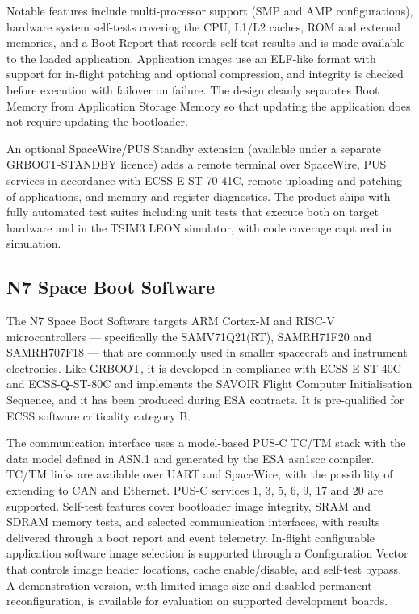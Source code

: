 Notable features include multi-processor support (SMP and AMP configurations), hardware system self-tests covering the CPU, L1/L2 caches, ROM and external memories, and a Boot Report that records self-test results and is made available to the loaded application. Application images use an ELF-like format with support for in-flight patching and optional compression, and integrity is checked before execution with failover on failure. The design cleanly separates Boot Memory from Application Storage Memory so that updating the application does not require updating the bootloader.

An optional SpaceWire/PUS Standby extension (available under a separate GRBOOT-STANDBY licence) adds a remote terminal over SpaceWire, PUS services in accordance with ECSS-E-ST-70-41C, remote uploading and patching of applications, and memory and register diagnostics. The product ships with fully automated test suites including unit tests that execute both on target hardware and in the TSIM3 LEON simulator, with code coverage captured in simulation.

\subsection{N7 Space Boot Software}
\label{subsection:related-space-n7space}

The N7 Space Boot Software \cite{N7-Space-BSW} targets ARM Cortex-M and RISC-V microcontrollers — specifically the SAMV71Q21(RT), SAMRH71F20 and SAMRH707F18 — that are commonly used in smaller spacecraft and instrument electronics. Like GRBOOT, it is developed in compliance with ECSS-E-ST-40C and ECSS-Q-ST-80C and implements the SAVOIR Flight Computer Initialisation Sequence, and it has been produced during ESA contracts. It is pre-qualified for ECSS software criticality category B.

The communication interface uses a model-based PUS-C TC/TM stack with the data model defined in ASN.1 and generated by the ESA asn1scc compiler. TC/TM links are available over UART and SpaceWire, with the possibility of extending to CAN and Ethernet. PUS-C services 1, 3, 5, 6, 9, 17 and 20 are supported. Self-test features cover bootloader image integrity, SRAM and SDRAM memory tests, and selected communication interfaces, with results delivered through a boot report and event telemetry. In-flight configurable application software image selection is supported through a Configuration Vector that controls image header locations, cache enable/disable, and self-test bypass. A demonstration version, with limited image size and disabled permanent reconfiguration, is available for evaluation on supported development boards.

